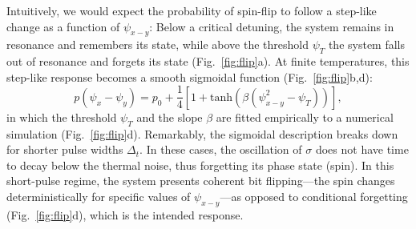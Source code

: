 Intuitively, we would expect the probability of spin-flip to follow a step-like change as a function of $\psi_{x-y}$: Below a critical detuning, the system remains in resonance and remembers its state, while above the threshold $\psi_T$ the system falls out of resonance and forgets its state (Fig.~\ref{fig:flip}a).  At finite temperatures, this step-like response becomes a smooth sigmoidal function (Fig.~\ref{fig:flip}b,d):
\begin{equation}
p(\psi_x-\psi_y)=p_0+\frac{1}{4}\left[1+\text{tanh}\left(\beta(\psi_{x-y}^2-\psi_T)\right)\right],
\label{eqn:switchprobability}
\end{equation}
in which the threshold $\psi_T$ and the slope $\beta$ are fitted empirically to a numerical simulation (Fig.~\ref{fig:flip}d). Remarkably, the sigmoidal description breaks down for shorter pulse widths $\Delta_t$. In these cases, the oscillation of $\sigma$ does not have time to decay below the thermal noise, thus forgetting its phase state (spin). In this short-pulse regime, the system presents coherent bit flipping---the spin changes deterministically for specific values of $\psi_{x-y}$---as opposed to conditional forgetting (Fig.~\ref{fig:flip}d), which is the intended response.







